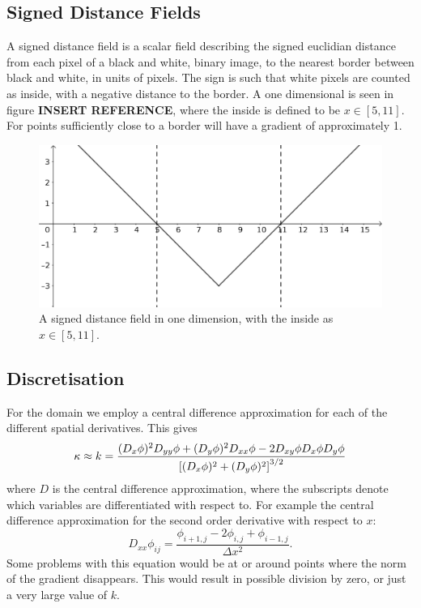 \documentclass[sigconf]{acmart}
\begin{document}
\subsection{Signed Distance Fields}
A signed distance field is a scalar field describing the signed euclidian distance from each pixel of a black and white, binary image, to the nearest border between black and white, in units of pixels. The sign is such that white pixels are counted as inside, with a negative distance to the border. A one dimensional is seen in figure \textbf{INSERT REFERENCE}, where the inside is defined to be $ x \in [5, 11] $. For points sufficiently close to a border will have a gradient of approximately 1.
\begin{figure}
	\includegraphics[width=\linewidth]{signed_distance_1d}
	\caption{A signed distance field in one dimension, with the inside as $ x \in [5, 11] $.}
	\label{fig:signed_dist}
\end{figure}


\subsection{Discretisation}
For the domain we employ a central difference approximation for each of the different spatial derivatives. This gives
\begin{equation}\label{key}
	\kappa \approx k = \frac{(D_x \phi)^2 D_{yy}\phi + (D_y \phi)^2 D_{xx}\phi - 2D_{xy}\phi D_x \phi D_y \phi}{\left[ (D_x\phi)^2 + (D_y\phi)^2 \right]^{3/2}}
\end{equation}
where $ D $  is the central difference approximation, where the subscripts denote which variables are differentiated with respect to. For example the central difference approximation for the second order derivative with respect to $ x $:
\begin{equation}\label{key}
	D_{xx} \phi_{ij} = \frac{\phi_{i+1, j} - 2\phi_{i,j} + \phi_{i-1,j}}{\Delta x^2}.
\end{equation}
Some problems with this equation would be at or around points where the norm of the gradient disappears. This would result in possible division by zero, or just a very large value of $ k $.
\end{document}
